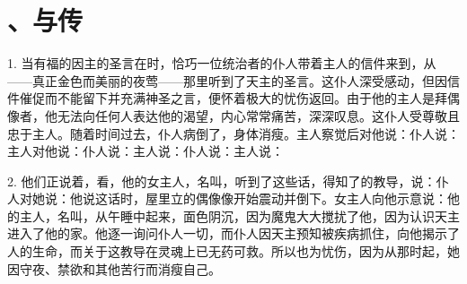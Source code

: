 
\chapter{、与传}


1. 当有福的因主的圣言在时，恰巧一位统治者的仆人带着主人的信件来到，从——真正金色而美丽的夜莺——那里听到了天主的圣言。这仆人深受感动，但因信件催促而不能留下并充满神圣之言，便怀着极大的忧伤返回。由于他的主人是拜偶像者，他无法向任何人表达他的渴望，内心常常痛苦，深深叹息。这仆人受尊敬且忠于主人。随着时间过去，仆人病倒了，身体消瘦。主人察觉后对他说：仆人说：主人对他说：仆人说：主人说：仆人说：主人说：\par

2. 他们正说着，看，他的女主人，名叫，听到了这些话，得知了的教导，说：仆人对她说：他说这话时，屋里立的偶像像开始震动并倒下。女主人向他示意说：他的主人，名叫，从午睡中起来，面色阴沉，因为魔鬼大大搅扰了他，因为认识天主进入了他的家。他逐一询问仆人一切，而仆人因天主预知被疾病抓住，向他揭示了人的生命，而关于这教导在灵魂上已无药可救。所以也为忧伤，因为从那时起，她因守夜、禁欲和其他苦行而消瘦自己。\par

